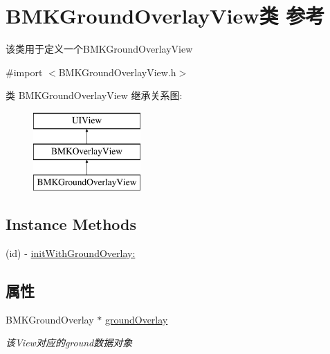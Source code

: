 \hypertarget{interface_b_m_k_ground_overlay_view}{\section{B\+M\+K\+Ground\+Overlay\+View类 参考}
\label{interface_b_m_k_ground_overlay_view}
}


该类用于定义一个\+B\+M\+K\+Ground\+Overlay\+View  




{\ttfamily \#import $<$B\+M\+K\+Ground\+Overlay\+View.\+h$>$}

类 B\+M\+K\+Ground\+Overlay\+View 继承关系图\+:\begin{figure}[H]
\begin{center}
\leavevmode
\includegraphics[height=3.000000cm]{interface_b_m_k_ground_overlay_view}
\end{center}
\end{figure}
\subsection*{Instance Methods}
\begin{DoxyCompactItemize}
\item 
(id) -\/ \hyperlink{interface_b_m_k_ground_overlay_view_a9a2e7f5341b40608aff7e8e70f219800}{init\+With\+Ground\+Overlay\+:}
\end{DoxyCompactItemize}
\subsection*{属性}
\begin{DoxyCompactItemize}
\item 
\hypertarget{interface_b_m_k_ground_overlay_view_afe3e5c81b5ba3b9a47dda8d3593fd8f2}{B\+M\+K\+Ground\+Overlay $\ast$ \hyperlink{interface_b_m_k_ground_overlay_view_afe3e5c81b5ba3b9a47dda8d3593fd8f2}{ground\+Overlay}}\label{interface_b_m_k_ground_overlay_view_afe3e5c81b5ba3b9a47dda8d3593fd8f2}

\begin{DoxyCompactList}\small\item\em 该\+View对应的ground数据对象 \end{DoxyCompactList}\end{DoxyCompactItemize}
